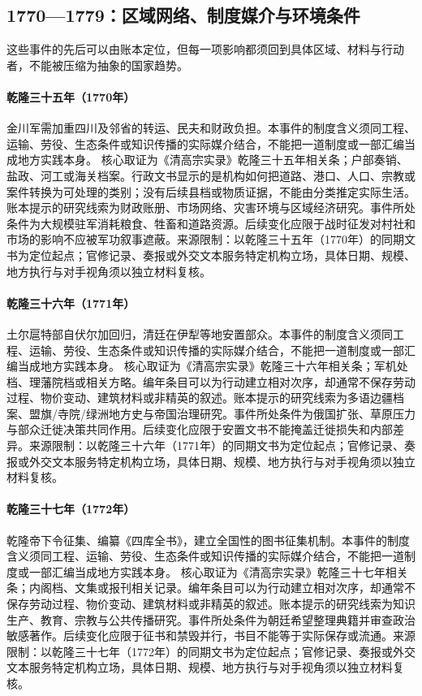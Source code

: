 \subsection{1770—1779：区域网络、制度媒介与环境条件}
这些事件的先后可以由账本定位，但每一项影响都须回到具体区域、材料与行动者，不能被压缩为抽象的国家趋势。
\hypertarget{civic:EQ-1770-SICHUAN-SUPPLY-BURDEN}{}\paragraph{乾隆三十五年（1770年）}金川军需加重四川及邻省的转运、民夫和财政负担。本事件的制度含义须同工程、运输、劳役、生态条件或知识传播的实际媒介结合，不能把一道制度或一部汇编当成地方实践本身。 核心取证为《清高宗实录》乾隆三十五年相关条；户部奏销、盐政、河工或海关档案。行政文书显示的是机构如何把道路、港口、人口、宗教或案件转换为可处理的类别；没有后续县档或物质证据，不能由分类推定实际生活。账本提示的研究线索为财政账册、市场网络、灾害环境与区域经济研究。事件所处条件为大规模驻军消耗粮食、牲畜和道路资源。后续变化应限于战时征发对村社和市场的影响不应被军功叙事遮蔽。来源限制：以乾隆三十五年（1770年）的同期文书为定位起点；官修记录、奏报或外交文本服务特定机构立场，具体日期、规模、地方执行与对手视角须以独立材料复核。
\hypertarget{civic:EQ-1771-TORGHUT-RETURN}{}\paragraph{乾隆三十六年（1771年）}土尔扈特部自伏尔加回归，清廷在伊犁等地安置部众。本事件的制度含义须同工程、运输、劳役、生态条件或知识传播的实际媒介结合，不能把一道制度或一部汇编当成地方实践本身。 核心取证为《清高宗实录》乾隆三十六年相关条；军机处档、理藩院档或相关方略。编年条目可以为行动建立相对次序，却通常不保存劳动过程、物价变动、建筑材料或非精英的叙述。账本提示的研究线索为多语边疆档案、盟旗/寺院/绿洲地方史与帝国治理研究。事件所处条件为俄国扩张、草原压力与部众迁徙决策共同作用。后续变化应限于安置文书不能掩盖迁徙损失和内部差异。来源限制：以乾隆三十六年（1771年）的同期文书为定位起点；官修记录、奏报或外交文本服务特定机构立场，具体日期、规模、地方执行与对手视角须以独立材料复核。
\hypertarget{civic:EQ-1772-SIKU-QUANSHU-ORDER}{}\paragraph{乾隆三十七年（1772年）}乾隆帝下令征集、编纂《四库全书》，建立全国性的图书征集机制。本事件的制度含义须同工程、运输、劳役、生态条件或知识传播的实际媒介结合，不能把一道制度或一部汇编当成地方实践本身。 核心取证为《清高宗实录》乾隆三十七年相关条；内阁档、文集或报刊相关记录。编年条目可以为行动建立相对次序，却通常不保存劳动过程、物价变动、建筑材料或非精英的叙述。账本提示的研究线索为知识生产、教育、宗教与公共传播研究。事件所处条件为朝廷希望整理典籍并审查政治敏感著作。后续变化应限于征书和禁毁并行，书目不能等于实际保存或流通。来源限制：以乾隆三十七年（1772年）的同期文书为定位起点；官修记录、奏报或外交文本服务特定机构立场，具体日期、规模、地方执行与对手视角须以独立材料复核。
